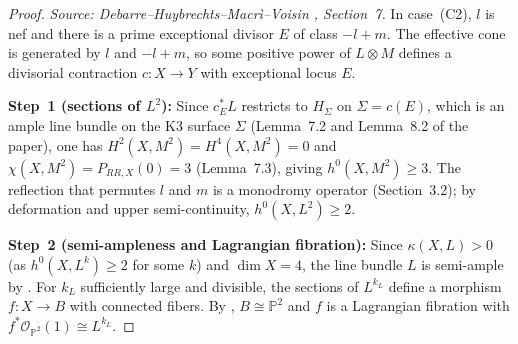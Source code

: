 \begin{proof}
  \textit{Source: Debarre--Huybrechts--Macr\`i--Voisin \cite{MR4654610}, Section~7.}
  In case~(C2), \(l\) is nef and there is a prime exceptional divisor \(E\) of class
  \(-l + m\).  The effective cone is generated by \(l\) and \(-l + m\), so some positive
  power of \(L \otimes M\) defines a divisorial contraction \(c \colon X \to Y\) with
  exceptional locus \(E\).

  \textbf{Step~1 (sections of \(L^2\)):} Since \(c_E^\ast L\) restricts to \(H_\Sigma\)
  on \(\Sigma = c(E)\), which is an ample line bundle on the K3 surface \(\Sigma\) (Lemma~7.2
  and Lemma~8.2 of the paper), one has \(H^2(X, M^2) = H^4(X, M^2) = 0\) and
  \(\chi(X, M^2) = P_{RR,X}(0) = 3\) (Lemma~7.3), giving \(h^0(X, M^2) \ge 3\).  The
  reflection that permutes \(l\) and \(m\) is a monodromy operator (Section~3.2); by
  deformation and upper semi-continuity, \(h^0(X, L^2) \ge 2\).

  \textbf{Step~2 (semi-ampleness and Lagrangian fibration):} Since \(\kappa(X, L) > 0\)
  (as \(h^0(X, L^k) \ge 2\) for some \(k\)) and \(\dim X = 4\), the line bundle \(L\) is
  semi-ample by \cite[Theorem~1.5]{fuk}.  For \(k_L\) sufficiently large and divisible,
  the sections of \(L^{k_L}\) define a morphism \(f \colon X \to B\) with connected fibers.
  By \cite{hux}, \(B \cong \mathbb{P}^2\) and \(f\) is a Lagrangian fibration with
  \(f^*\mathcal{O}_{\mathbb{P}^2}(1) \cong L^{k_L}\).
\end{proof}

